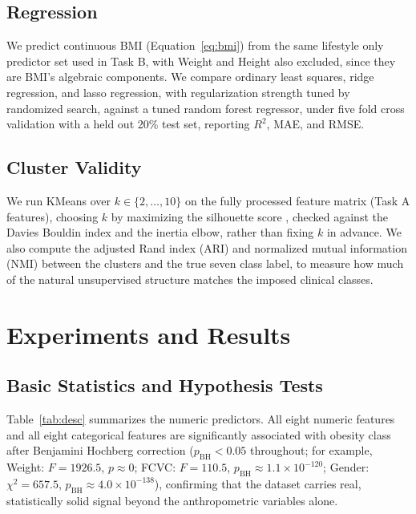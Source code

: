 \documentclass[journal]{IEEEtran}
\begin{document}
\subsection{Regression}
\label{sec:regression}
We predict continuous BMI (Equation~\eqref{eq:bmi}) from the same lifestyle only predictor set used in Task B, with Weight and Height also excluded, since they are BMI's algebraic components. We compare ordinary least squares, ridge regression, and lasso regression, with regularization strength tuned by randomized search, against a tuned random forest regressor, under five fold cross validation with a held out 20\% test set, reporting $R^{2}$, MAE, and RMSE.

\subsection{Cluster Validity}
We run KMeans over $k \in \{2,\ldots,10\}$ on the fully processed feature matrix (Task A features), choosing $k$ by maximizing the silhouette score \cite{rousseeuw1987silhouettes}, checked against the Davies Bouldin index \cite{daviesbouldin1979} and the inertia elbow, rather than fixing $k$ in advance. We also compute the adjusted Rand index (ARI) and normalized mutual information (NMI) between the clusters and the true seven class label, to measure how much of the natural unsupervised structure matches the imposed clinical classes.

\section{Experiments and Results}
\label{sec:results}

\subsection{Basic Statistics and Hypothesis Tests}
Table~\ref{tab:desc} summarizes the numeric predictors. All eight numeric features and all eight categorical features are significantly associated with obesity class after Benjamini Hochberg correction ($p_{\mathrm{BH}} < 0.05$ throughout; for example, Weight: $F=1926.5$, $p \approx 0$; FCVC: $F=110.5$, $p_{\mathrm{BH}} \approx 1.1\times10^{-120}$; Gender: $\chi^2=657.5$, $p_{\mathrm{BH}} \approx 4.0\times10^{-138}$), confirming that the dataset carries real, statistically solid signal beyond the anthropometric variables alone.
\end{document}
